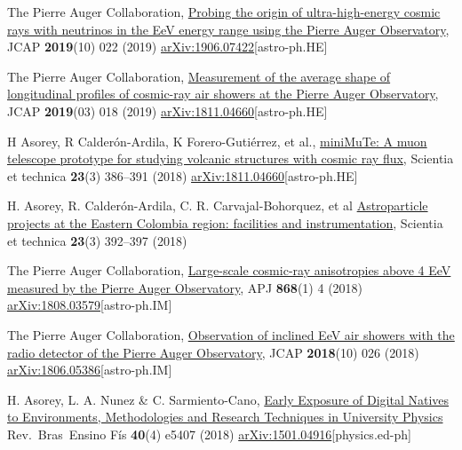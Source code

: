 \begin{etaremune}
\item {}The Pierre Auger Collaboration, \href{https://doi.org/10.1088/1475-7516/2019/10/022}{Probing the origin of ultra-high-energy cosmic rays with neutrinos in the EeV energy range using the Pierre Auger Observatory}, JCAP {\textbf{2019}}(10) 022 (2019) \href{https://arxiv.org/abs/1906.07422}{arXiv:1906.07422}[astro-ph.HE]

\item {}The Pierre Auger Collaboration, \href{https://doi.org/10.1088/1475-7516/2019/03/018}{Measurement of the average shape of longitudinal profiles of cosmic-ray air showers at the Pierre Auger Observatory}, JCAP {\textbf{2019}}(03) 018 (2019) \href{https://arxiv.org/abs/1811.04660}{arXiv:1811.04660}[astro-ph.HE]

\item {} H Asorey, R Calderón-Ardila, K Forero-Gutiérrez, et al., \href{http://dx.doi.org/10.22517/23447214.17501}{miniMuTe: A muon telescope prototype for studying volcanic structures with cosmic ray flux}, Scientia et technica {\textbf{23}}(3) 386--391 (2018) \href{https://arxiv.org/abs/1811.04660}{arXiv:1811.04660}[astro-ph.HE]

\item {}H. Asorey, R. Calderón-Ardila, C. R. Carvajal-Bohorquez, et al \href{http://dx.doi.org/10.22517/23447214.17561}{Astroparticle projects at the Eastern Colombia region: facilities and instrumentation}, Scientia et technica {\textbf{23}}(3) 392--397 (2018)

\item {}The Pierre Auger Collaboration, \href{https://doi.org/10.3847/1538-4357/aae689}{{Large-scale cosmic-ray anisotropies above 4 EeV measured by the Pierre Auger Observatory}}, APJ {\textbf{868}}(1) 4 (2018) \href{https://arxiv.org/abs/1808.03579}{arXiv:1808.03579}[astro-ph.IM]

\item {}The Pierre Auger Collaboration, \href{https://doi.org/10.1088/1475-7516/2018/10/026}{{Observation of inclined EeV air showers with the radio detector of the Pierre Auger Observatory}}, JCAP {\textbf{2018}}(10) 026 (2018) \href{https://arxiv.org/abs/1806.05386}{arXiv:1806.05386}[astro-ph.IM]

\item {} H. Asorey, L. A. Nunez \& C. Sarmiento-Cano, \href{http://dx.doi.org/10.1590/1806-9126-rbef-2018-0092}{{Early Exposure of Digital Natives to Environments, Methodologies and Research Techniques in University Physics}} Rev.\ Bras\  Ensino Fís {\textbf{40}}(4) e5407 (2018) \href{http://arxiv.org/abs/1501.04916}{arXiv:1501.04916}[physics.ed-ph]


\end{etaremune}
